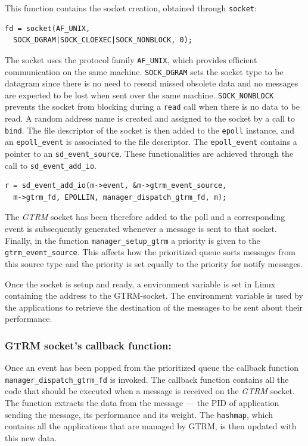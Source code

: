 \documentclass[nobiblatex]{LTHthesis}
\begin{document}
This function contains the socket creation, obtained through
\texttt{socket}:
\begin{verbatim}
fd = socket(AF_UNIX, 
  SOCK_DGRAM|SOCK_CLOEXEC|SOCK_NONBLOCK, 0);
\end{verbatim}
The socket uses the protocol family \texttt{AF\_UNIX}, which provides
efficient communication on the same machine. \texttt{SOCK\_DGRAM} sets 
the socket type to be datagram since there is no need to resend missed
obsolete data and no messages are expected to be lost when sent over the 
same machine. \texttt{SOCK\_NONBLOCK} prevents the socket from blocking 
during a \texttt{read} call when there is no data to be read. A random 
address name is created and assigned to the socket by a call to 
\texttt{bind}. The file descriptor of the socket is then added to the 
\texttt{epoll} instance, and an \texttt{epoll\_event} is associated to
the file descriptor. The \texttt{epoll\_event} contains a pointer to 
an \texttt{sd\_event\_source}. These functionalities are achieved through
the call to \texttt{sd\_event\_add\_io}.

\begin{verbatim}
r = sd_event_add_io(m->event, &m->gtrm_event_source, 
  m->gtrm_fd, EPOLLIN, manager_dispatch_gtrm_fd, m);
\end{verbatim}

The \emph{GTRM} socket has been therefore added to the poll and a corresponding 
event is subsequently generated whenever a message is sent to that socket. 
Finally, in the function \texttt{manager\_setup\_gtrm} a priority is given
to the \texttt{gtrm\_event\_source}. This affects how the prioritized 
queue sorts messages from this source type and the priority is set equally
to the priority for notify messages.

Once the socket is setup and ready, a environment variable is set in 
Linux containing the address to the GTRM-socket. The environment variable is
used by the applications to retrieve the destination of the messages to be
sent about their performance.

\subsubsection{GTRM socket's callback function:}
Once an event has been popped from the prioritized queue the callback 
function \texttt{manager\_dispatch\_gtrm\_fd} is invoked. 
The callback function contains all the code that should be executed when a
message is received on the \emph{GTRM} socket. The function extracts the data 
from the message --- the PID of application sending the message, its
performance and its weight. The \texttt{hashmap}, which contains all the
applications that are managed by GTRM, is then updated with this new data. 
\end{document}

